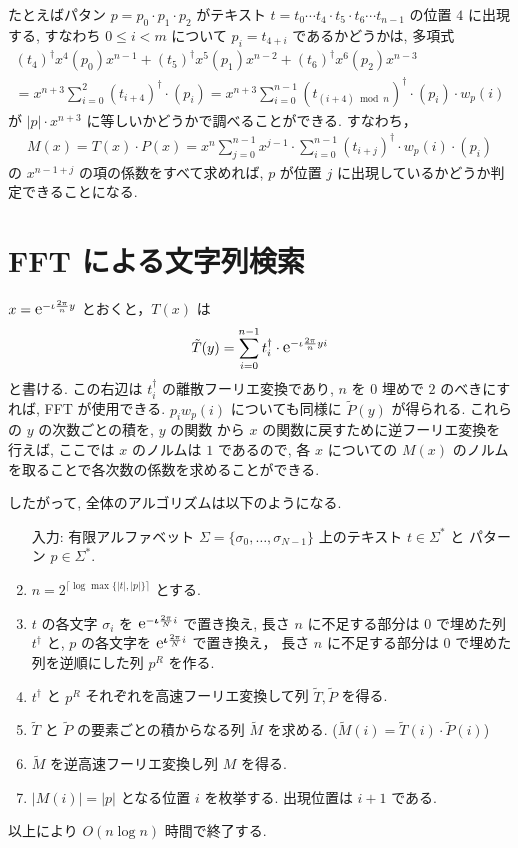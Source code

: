 \documentclass[11pt]{jarticle}
\newcommand{\napier}{%
\mathnormal{\mbox{\large{$\mathrm{e}$}}}    %
}
\begin{document}
たとえばパタン $p = p_0 \cdot p_1 \cdot p_2$ がテキスト $t = t_0 \cdots t_4 \cdot t_5 \cdot t_6 \cdots t_{n-1}$ の位置 $4$ に出現する, すなわち $0 \leq i < m$ について $p_i = t_{4+i}$ であるかどうかは, 多項式
\begin{eqnarray*}
 (t_4)^\dagger x^{4} (p_0) x^{n-1} + (t_5)^\dagger x^{5} (p_1) x^{n-2} + (t_6)^\dagger x^{6} (p_2) x^{n-3}\\
= x^{n+3}\sum_{i=0}^{2} (t_{i+4})^\dagger\cdot (p_{i}) 
= x^{n+3} \sum_{i=0}^{n-1}(t_{(i+4) \bmod n})^\dagger \cdot (p_i) \cdot w_p(i)
\end{eqnarray*}
が $|p|\cdot x^{n+3}$ に等しいかどうかで調べることができる. 
すなわち，
\begin{eqnarray*}
M(x) = T(x)\cdot P(x) = 
x^{n} \sum_{j=0}^{n-1}  x^{j-1} \cdot \sum_{i = 0}^{n-1} (t_{i+j})^\dagger  \cdot w_p(i) \cdot (p_i)
\end{eqnarray*}
の $x^{n-1+j}$ の項の係数をすべて求めれば, $p$ が位置 $j$ に出現しているかどうか判定できることになる. 

\section{FFT による文字列検索}

$x = \napier^{-\iota\frac{2\pi}{n}y}$ とおくと，$T(x)$ は
\[
\tilde{T}(y) = \sum_{i=0}^{n-1} t^\dagger_i \cdot \napier^{-\iota\frac{2\pi}{n}yi}
\]
と書ける. 
この右辺は $t^\dagger_i$ の離散フーリエ変換であり, $n$ を $0$ 埋めで $2$ のべきにすれば, FFT が使用できる. 
$p_i w_p(i)$ についても同様に $\tilde{P}(y)$ が得られる. 
これらの $y$ の次数ごとの積を,
$y$ の関数 から $x$ の関数に戻すために逆フーリエ変換を行えば, ここでは $x$ のノルムは $1$ であるので, 各 $x$ についての $M(x)$ のノルムを取ることで各次数の係数を求めることができる. 

したがって, 全体のアルゴリズムは以下のようになる. 

\begin{enumerate}
\item[入力:]有限アルファベット $\Sigma = \{\sigma_0, \ldots, \sigma_{N-1}\}$ 上のテキスト $t \in \Sigma^*$ と パターン $p \in \Sigma^*$. 
\item $n = 2^{\lceil{\log {\max\{|t|, |p|\}}}\rceil}$ とする. 
\item $t$ の各文字 $\sigma_i$ を $\napier^{-\boldsymbol\iota\frac{2\pi}{N}i}$ で置き換え, 長さ $n$ に不足する部分は $0$ で埋めた列 $t^\dagger$ と, 
$p$ の各文字を $\napier^{\boldsymbol\iota\frac{2\pi}{N}i}$ で置き換え， 長さ $n$ に不足する部分は $0$ で埋めた列を逆順にした列 $p^R$ を作る. 
\item $t^\dagger$ と $p^R$ それぞれを高速フーリエ変換して列 $\tilde{T}, \tilde{P}$ を得る.
\item $\tilde{T}$ と $\tilde{P}$ の要素ごとの積からなる列 $\tilde{M}$ を求める. ($\tilde{M}(i) = \tilde{T}(i)\cdot \tilde{P}(i)$)
\item $\tilde{M}$ を逆高速フーリエ変換し列 $M$ を得る.  
\item $|M(i)| = |p|$ となる位置 $i$ を枚挙する. 
出現位置は $i+1$ である. 
\end{enumerate}
以上により $O(n \log n)$ 時間で終了する. 
\end{document}
